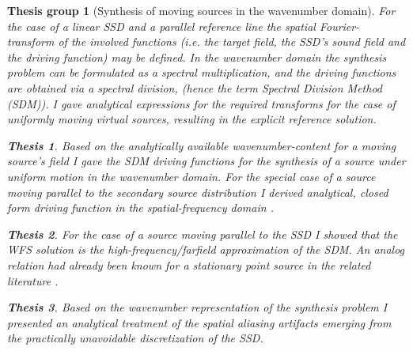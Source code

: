 \documentclass[10pt,twoside]{article}
\theoremstyle{thesisgroupstyle}
\newtheorem{thesisgroup}{Thesis group}
\theoremstyle{indented}
\newtheorem{thesis}{Thesis}[thesisgroup]
\begin{document}
\begin{thesisgroup}[Synthesis of moving sources in the wavenumber domain]
For the case of a linear SSD and a parallel reference line the spatial Fourier-transform of the involved functions (i.e. the target field, the SSD's sound field and the driving function) may be defined.
In the wavenumber domain the synthesis problem can be formulated as a spectral multiplication, and the driving functions are obtained via a spectral division, (hence the term \emph{Spectral Division Method (SDM)}).
I gave analytical expressions for the required transforms for the case of uniformly moving virtual sources, resulting in the explicit reference solution.
\begin{thesis} 
Based on the analytically available wavenumber-content for a moving source's field I gave the SDM driving functions for the synthesis of a source under uniform motion in the wavenumber domain.
For the special case of a source moving parallel to the secondary source distribution I derived analytical, closed form driving function in the spatial-frequency domain \cite{Firtha2014:daga_booklet, Firtha2014:isma_booklet, firtha2015sound_booklet}.\end{thesis}
\begin{thesis} 
For the case of a source moving parallel to the SSD I showed that the WFS solution is the high-frequency/farfield approximation of the SDM. An analog relation had already been known for a stationary point source in the related literature \cite{firtha2015sound_booklet}.
\end{thesis}
\begin{thesis} 
Based on the wavenumber representation of the synthesis problem I presented an analytical treatment of the spatial aliasing artifacts emerging from the practically unavoidable discretization of the SSD.

\end{thesis}
\end{thesisgroup}
\end{document}
